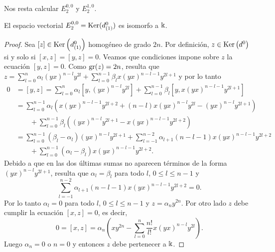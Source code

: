 \documentclass[fleqn,../tesis.tex]{subfiles}
\begin{document}
Nos resta calcular $E^{0,0}_{2}$ y $E^{1, 0}_{2}$.
\begin{prop}
    El espacio vectorial $E^{0, 0}_{2} = \operatorname{Ker}(d^{0}_{(1)})$ es isomorfo a $\Bbbk$.
\end{prop}
\begin{proof}
    Sea $[z] \in \operatorname{Ker}\left(d^{0}_{(1)}\right)$ homogéneo de grado $2n$.
    Por definición, $z \in \operatorname{Ker}\left(d^{0}\right)$ si y solo si $[x, z] = [y, z] = 0$.
    Veamos que condiciones impone sobre $z$ la ecuación $[y, z] = 0$. Como $\operatorname{gr}(z) = 2n$, resulta que
    $z= \sum_{l = 0}^{n}\alpha_l(yx)^{n - l}y^{2l} + \sum_{l = 0}^{n - 1}\beta_l x(yx)^{n - l - 1}y^{2l + 1}$ y por lo tanto
    \begin{align*}
        0 &= [y, z] = \sum_{l = 0}^{n}\alpha_l\left[y, (yx)^{n - l}y^{2l}\right]
            + \sum_{l = 0}^{n - 1}\beta_l\left[y, x(yx)^{n - l - 1}y^{2l + 1}\right] \\
        &= \sum_{l = 0}^{n - 1}\alpha_l \left(x(yx)^{n - l - 1}y^{2l +2} + (n - l)x (yx)^{n - l}y^{2l} - (yx)^{n - l}y^{2l  +1}\right)\\
        &\qquad + \sum_{l = 0}^{n - 1}\beta_l \left((yx)^{n - l}y^{2l + 1} - x(yx)^{n - l - 1}y^{2l + 2}\right)\\
        & = \sum_{l = 0}^{n - 1}\left(\beta_l - \alpha_l\right)(yx)^{n - l}y^{2l + 1} 
            + \sum_{l = -1}^{n - 2}\alpha_{l + 1} (n - l - 1) x(yx)^{n - l - 1}y^{2l + 2}\\
        &\qquad + \sum_{l = 0}^{n -1}\left(\alpha_l - \beta_l \right)x(yx)^{n - l - 1}y^{2l +2}.
    \end{align*}
    Debido a que en las dos últimas sumas no aparecen términos de la forma $(yx)^{n - l}y^{2l + 1}$, resulta que $\alpha_l = \beta_l$
    para todo $l$, $0 \leq l \leq n - 1$ y
    \[
        \sum_{l = -1}^{n - 2}\alpha_{l + 1} (n - l - 1) x(yx)^{n - l - 1}y^{2l + 2} = 0.
    \]
    Por lo tanto $\alpha_l = 0$ para todo $l$, $0 \leq l \leq n- 1$ y $z = \alpha_n y^{2n}$. Por otro lado $z$ debe cumplir
    la ecuación $[x, z] = 0$, es decir,
    \[
        0 = [x, z] = \alpha_n \left( xy^{2n} - \sum_{l = 0}^{n}\frac{n!}{l!}x(yx)^{n - l}y^{2l}\right).    
    \]
    Luego $\alpha_n = 0$ o $n = 0$ y entonces $z$ debe pertenecer a $\Bbbk$.
    

\end{proof}
\end{document}
